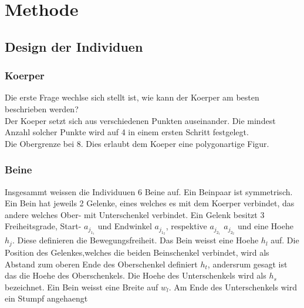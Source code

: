 %
%


\chapter{Methode}

  \section{Design der Individuen}

    \subsection{Koerper}
    \label{sub:Koerper}
      Die erste Frage wechlse sich stellt ist, wie kann der Koerper am besten beschrieben werden? \\
      Der Koeper setzt sich aus verschiedenen Punkten auseinander. Die mindest Anzahl solcher Punkte wird auf 4 in einem ersten Schritt festgelegt. \\
      Die Obergrenze bei 8. Dies erlaubt dem Koeper eine polygonartige Figur.
    \subsection {Beine}
    \label{sub:Beine}
      Insgesammt weissen die Individuuen 6 Beine auf. Ein Beinpaar ist symmetrisch. Ein Bein hat jeweils 2 Gelenke, eines welches es mit dem Koerper verbindet,
      das andere welches Ober- mit Unterschenkel verbindet. Ein Gelenk besitzt 3 Freiheitsgrade, Start- \(a_{j_{1_{1}}}\)  und Endwinkel \(a_{j_{1_{2}}}\),
      respektive \(a_{j_{2_{1}}}\) \(a_{j_{2_{2}}}\) und eine Hoehe \(h_{j}\).
      Diese definieren die Bewegungsfreiheit. Das Bein weisst eine Hoehe \(h_{l}\) auf. Die Position des Gelenkes,welches die beiden Beinschenkel verbindet,
      wird als Abstand zum oberen Ende des Oberschenkel definiert \(h_{t}\), andersrum gesagt ist das die Hoehe des Oberschenkels.
      Die Hoehe des Unterschenkels wird als \(h_{s}\) bezeichnet. Ein Bein weisst eine Breite auf \(w_{l}\).
      Am Ende des Unterschenkels wird ein Stumpf angehaengt \\
      \\
